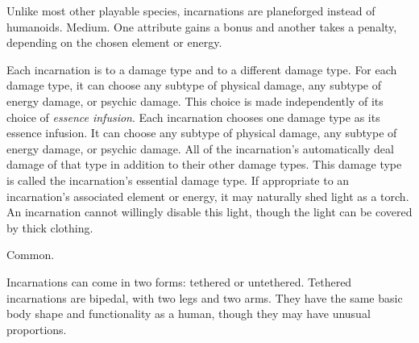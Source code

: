          Unlike most other playable species, incarnations are planeforged instead of humanoids.
         Medium.
         One attribute gains a  bonus and another takes a  penalty, depending on the chosen element or energy.
        \begin{itemize}
             Each incarnation is \impervious to a damage type and \vulnerable to a different damage type.
            For each damage type, it can choose any subtype of physical damage, any subtype of energy damage, or psychic damage.
            This choice is made independently of its choice of \textit{essence infusion}.
             Each incarnation chooses one damage type as its essence infusion.
            It can choose any subtype of physical damage, any subtype of energy damage, or psychic damage.
            All of the incarnation's  automatically deal damage of that type in addition to their other damage types.
            This damage type is called the incarnation's essential damage type.
             If appropriate to an incarnation's associated element or energy, it may naturally shed light as a torch.
            An incarnation cannot willingly disable this light, though the light can be covered by thick clothing.
        \end{itemize}
         Common.

        Incarnations can come in two forms: tethered or untethered.
        Tethered incarnations are bipedal, with two legs and two arms.
        They have the same basic body shape and functionality as a human, though they may have unusual proportions.

